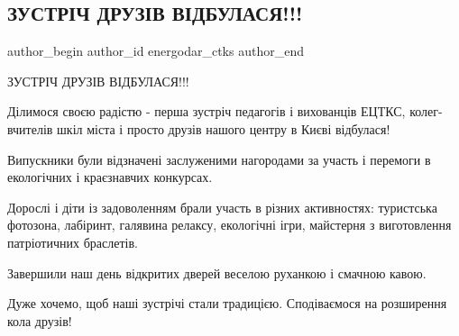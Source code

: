  
 
 
 
 

\subsection{ЗУСТРІЧ ДРУЗІВ ВІДБУЛАСЯ!!!}
\label{sec:02_09_2023.fb.energodar_ctks.1.zustrich_druziv_vidbulasja}

\ifcmt
 author_begin
   author_id energodar_ctks
 author_end
\fi

ЗУСТРІЧ ДРУЗІВ ВІДБУЛАСЯ!!!

Ділимося своєю радістю - перша зустріч педагогів і вихованців ЕЦТКС,
колег-вчителів шкіл міста і просто друзів нашого центру в Києві відбулася!

Випускники були відзначені заслуженими нагородами за участь і перемоги в
екологічних і краєзнавчих конкурсах.

Дорослі і діти із задоволенням брали участь в різних активностях: туристська
фотозона, лабіринт, галявина релаксу, екологічні ігри, майстерня з виготовлення
патріотичних браслетів. 

Завершили наш день відкритих дверей веселою руханкою і смачною кавою.

Дуже хочемо, щоб наші зустрічі стали традицією. Сподіваємося на розширення кола
друзів!
